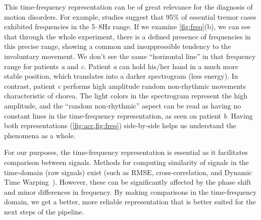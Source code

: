 This time-frequency representation can be of great relevance for the diagnosis of motion disorders. For example, studies suggest that 95\% of essential tremor cases exhibited frequencies in the 5--8Hz range. If we examine \cref{fig:freq}(b), we can see that through the whole experiment, there is a defined presence of frequencies in this precise range, showing a common and insuppressible tendency to the involuntary movement. We don't see the same ``horizontal line'' in that frequency range for patients \textit{a} and \textit{c}. Patient \textit{a} can hold his/her hand in a much more stable position, which translates into a darker spectrogram (less energy). In contrast, patient \textit{c} performs high amplitude random non-rhythmic movements characteristic of chorea. The light colors in the spectrogram represent the high amplitude, and the ``random non-rhythmic'' aspect can be read as having no constant lines in the time-frequency representation, as seen on patient \textit{b}. Having both representations (\cref{fig:acc,fig:freq}) side-by-side helps us understand the phenomena as a whole. 

For our purposes, the time-frequency representation is essential as it facilitates comparison between signals. Methods for computing similarity of signals in the time-domain (raw signals) exist (such as RMSE, cross-correlation, and Dynamic Time Warping~\citep{Gupta1996}). However, these can be significantly affected by the phase shift and minor differences in frequency. By making comparisons in the time-frequency domain, we get a better, more reliable representation that is better suited for the next steps of the pipeline.


